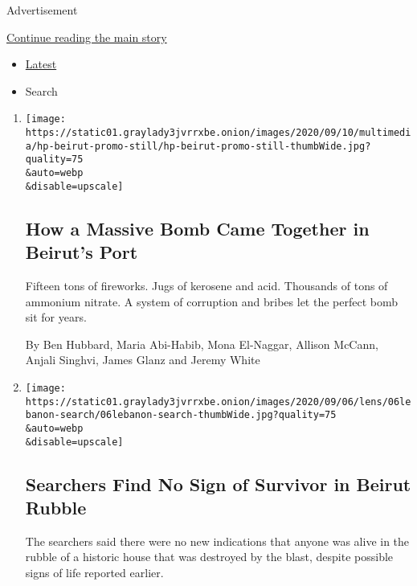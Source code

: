 Advertisement

\protect\hyperlink{after-mid1}{Continue reading the main story}

\begin{itemize}
\tightlist
\item
  \protect\hyperlink{stream-panel}{Latest}
\item
  Search
\end{itemize}

\begin{enumerate}
\def\labelenumi{\arabic{enumi}.}
\item
  \href{/interactive/2020/09/09/world/middleeast/beirut-explosion.html}{}

  \texttt{[image: https://static01.graylady3jvrrxbe.onion/images/2020/09/10/multimedia/hp-beirut-promo-still/hp-beirut-promo-still-thumbWide.jpg?quality=75\\\&auto=webp\\\&disable=upscale]}

  \hypertarget{how-a-massive-bomb-came-together-in-beiruts-port}{%
  \subsection{How a Massive Bomb Came Together in Beirut's
  Port}\label{how-a-massive-bomb-came-together-in-beiruts-port}}

  Fifteen tons of fireworks. Jugs of kerosene and acid. Thousands of
  tons of ammonium nitrate. A system of corruption and bribes let the
  perfect bomb sit for years.

  By Ben Hubbard, Maria Abi-Habib, Mona El-Naggar, Allison McCann,
  Anjali Singhvi, James Glanz and Jeremy White
\item
  \href{/2020/09/05/world/middleeast/beirut-search-survivor-lebanon.html}{}

  \texttt{[image: https://static01.graylady3jvrrxbe.onion/images/2020/09/06/lens/06lebanon-search/06lebanon-search-thumbWide.jpg?quality=75\\\&auto=webp\\\&disable=upscale]}

  \hypertarget{searchers-find-no-sign-of-survivor-in-beirut-rubble}{%
  \subsection{Searchers Find No Sign of Survivor in Beirut
  Rubble}\label{searchers-find-no-sign-of-survivor-in-beirut-rubble}}

  The searchers said there were no new indications that anyone was alive
  in the rubble of a historic house that was destroyed by the blast,
  despite possible signs of life reported earlier.


\end{enumerate}
